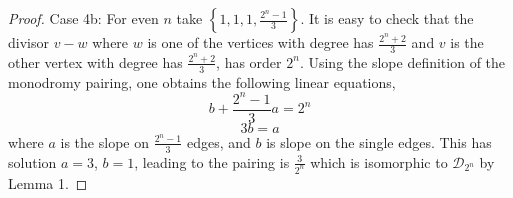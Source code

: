 \documentclass{amsart}
\theoremstyle{definition}
\newcommand{\DP}{\ensuremath{\mathcal{D}_{2^{n}}}}
\newcommand{\1}{\ensuremath{\mathds{1}}}
\begin{document}
\begin{proof}
    Case 4b: For even $n$ take $\left\{1, 1, 1, \frac{2^{n}-1}{3}\right\}$. It is easy to check that the divisor $v-w$ where $w$ is one of the vertices with degree has $\frac{2^{n}+2}{3}$ and $v$ is the other vertex with degree has $\frac{2^{n}+2}{3}$, has order $2^{n}$. Using the slope definition of the monodromy pairing, one obtains the following linear equations,
     \[
      b+ \frac{2^{n}-1}{3}a=2^{n}
     \]
     \[
      3b=a
     \]
    where $a$ is the slope on $ \frac{2^{n}-1}{3}$ edges, and $b$ is slope on the single edges. This has solution $a=3$, $b=1$, leading to the pairing is $\frac{3}{2^{n}}$ which is isomorphic to $\DP$ by Lemma 1.
 \end{proof}






































  
\end{document}
